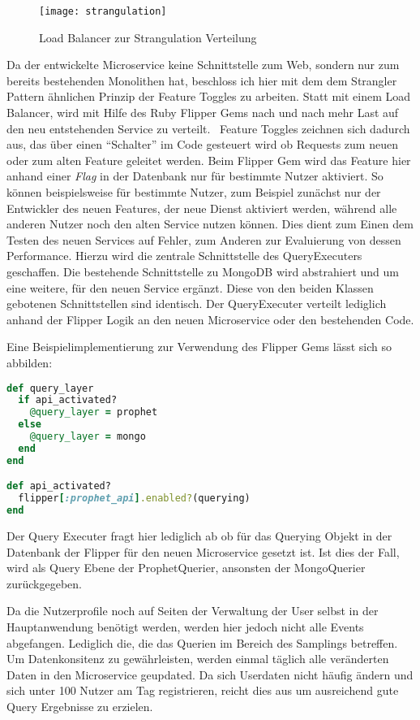 \begin{figure}[h]
    \caption{Load Balancer zur Strangulation Verteilung \cite{Hammant:Strangler}}
    \texttt{[image: strangulation]}
\end{figure}

Da der entwickelte Microservice keine Schnittstelle zum Web, sondern nur zum bereits bestehenden Monolithen hat, beschloss ich hier mit dem dem Strangler Pattern ähnlichen Prinzip der Feature Toggles\cite{fowler:featuretoggle} zu arbeiten. Statt mit einem Load Balancer, wird mit Hilfe des Ruby Flipper Gems\cite{flipper} nach und nach mehr Last auf den neu entstehenden Service zu verteilt.~\cite[vgl.][]{Hammant:Strangler}
Feature Toggles zeichnen sich dadurch aus, das über einen ``Schalter'' im Code gesteuert wird ob Requests zum neuen oder zum alten Feature geleitet werden. Beim Flipper Gem wird das Feature hier anhand einer \textit{Flag} in der Datenbank nur für bestimmte Nutzer aktiviert. So können beispielsweise für bestimmte Nutzer, zum Beispiel zunächst nur der Entwickler des neuen Features, der neue Dienst aktiviert werden, während alle anderen Nutzer noch den alten Service nutzen können. Dies dient zum Einen dem Testen des neuen Services auf Fehler, zum Anderen zur Evaluierung von dessen Performance.
Hierzu wird die zentrale Schnittstelle des QueryExecuters geschaffen. Die bestehende Schnittstelle zu MongoDB wird abstrahiert und um eine weitere, für den neuen Service ergänzt. Diese von den beiden Klassen gebotenen Schnittstellen sind identisch. Der QueryExecuter verteilt lediglich anhand der Flipper Logik an den neuen Microservice oder den bestehenden Code.

Eine Beispielimplementierung zur Verwendung des Flipper Gems lässt sich so abbilden:
\begin{lstlisting}[language=Ruby]
def query_layer
  if api_activated?
    @query_layer = prophet
  else
    @query_layer = mongo
  end
end

def api_activated?
  flipper[:prophet_api].enabled?(querying)
end
\end{lstlisting}
Der Query Executer fragt hier lediglich ab ob für das Querying Objekt in der Datenbank der Flipper für den neuen Microservice gesetzt ist. Ist dies der Fall, wird als Query Ebene der ProphetQuerier, ansonsten der MongoQuerier zurückgegeben.

Da die Nutzerprofile noch auf Seiten der Verwaltung der User selbst in der Hauptanwendung benötigt werden, werden hier jedoch nicht alle Events abgefangen. Lediglich die, die das Querien im Bereich des Samplings betreffen. Um Datenkonsitenz zu gewährleisten, werden einmal täglich alle veränderten Daten in den Microservice geupdated. Da sich Userdaten nicht häufig ändern und sich unter 100 Nutzer am Tag registrieren, reicht dies aus um ausreichend gute Query Ergebnisse zu erzielen.